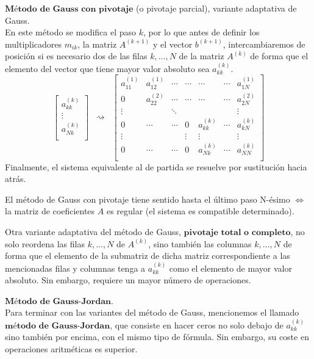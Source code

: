 \begin{nlist}
\item $\textbf{Método de Gauss con pivotaje}$ (o pivotaje parcial), variante adaptativa de Gauss.\\
En este método se modifica el paso $k$, por lo que antes de definir los multiplicadores $m_{ik}$, la matriz $A^{(k+1)}$ y el vector $b^{(k+1)}$, intercambiaremos de posición si es necesario dos de las filas $k,...,N$ de la matriz $A^{(k)}$ de forma que el elemento del vector que tiene mayor valor absoluto sea $a_{kk}^{(k)}$.
\[
\begin{bmatrix}
a_{kk}^{(k)} \\
\vdots \\
a_{Nk}^{(k)} \\
\end{bmatrix}
\; \; \rightsquigarrow \; \;
\begin{bmatrix}
a_{11}^{(1)} & a_{12}^{(1)} & \cdots & \cdots & \cdots & \cdots & a_{1N}^{(1)} \\
0 & a_{22}^{(2)} & \cdots & \cdots & \cdots & \cdots & a_{2N}^{(2)} \\
\vdots & & \ddots & & & & \vdots \\
0 & \cdots & \cdots & 0 & a_{kk}^{(k)} & \cdots & a_{kN}^{(k)} \\
\vdots & & & \vdots & \vdots & & \vdots \\
0 & \cdots & \cdots & 0 & a_{Nk}^{(k)} & \cdots & a_{NN}^{(k)}\\
\end{bmatrix}
\]
Finalmente, el sistema equivalente al de partida se resuelve por sustitución hacia atrás.
	\begin{nota}
	El método de Gauss con pivotaje tiene sentido hasta el último paso N-ésimo $\Leftrightarrow$ la matriz de coeficientes $A$ es regular (el sistema es compatible determinado).
	\end{nota}
			
	\begin{nota}
	Otra variante adaptativa del método de Gauss, $\textbf{pivotaje total o completo}$, no solo
reordena las filas $k,..., N$ de $A^{(k)}$, sino también las columnas $k,..., N$ de forma
que el elemento de la submatriz de dicha matriz correspondiente a las
mencionadas filas y columnas tenga a $a_{kk}^{(k)}$ como el elemento de mayor valor absoluto. Sin embargo, requiere un mayor número de operaciones.
	\end{nota}
		
\item $\textbf{Método de Gauss-Jordan}$.\\
Para terminar con las variantes del método de Gauss, mencionemos el llamado $\textbf{método}$ $\textbf{de}$ $\textbf{Gauss-Jordan}$, que consiste en hacer ceros no solo debajo de $a_{kk}^{(k)}$ sino
también por encima, con el mismo tipo de fórmula. Sin embargo, su coste en operaciones aritméticas es superior.
\end{nlist}
		

